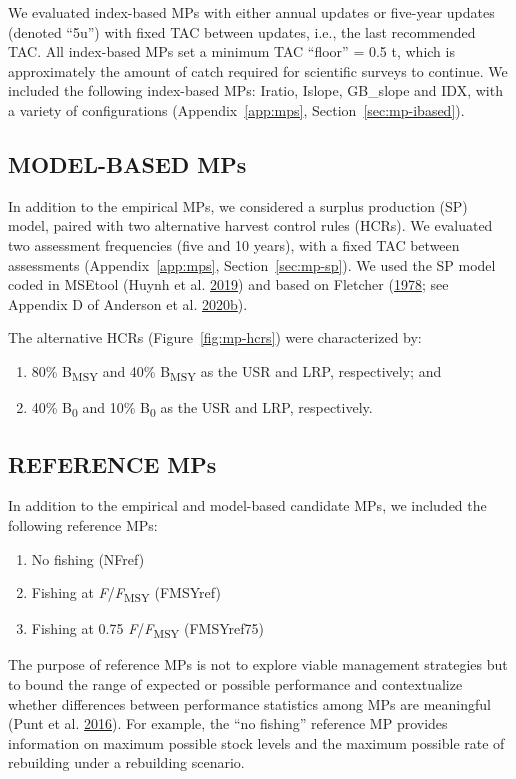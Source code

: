 \documentclass[11pt]{book}
\begin{document}
We evaluated index-based MPs with either annual updates or five-year updates (denoted ``5u'') with fixed TAC between updates, i.e., the last recommended TAC. All index-based MPs set a minimum TAC ``floor'' = 0.5 t, which is approximately the amount of catch required for scientific surveys to continue. We included the following index-based MPs: Iratio, Islope, GB\_slope and IDX, with a variety of configurations (Appendix~\ref{app:mps}, Section~\ref{sec:mp-ibased}).

\hypertarget{model-based-mps}{%
\subsection{MODEL-BASED MPs}\label{model-based-mps}}

In addition to the empirical MPs, we considered a surplus production (SP) model, paired with two alternative harvest control rules (HCRs). We evaluated two assessment frequencies (five and 10 years), with a fixed TAC between assessments (Appendix~\ref{app:mps}, Section~\ref{sec:mp-sp}). We used the SP model coded in MSEtool (Huynh et al. \protect\hyperlink{ref-huynh_msetool_2019}{2019}) and based on Fletcher (\protect\hyperlink{ref-fletcher1978}{1978}; see Appendix D of Anderson et al. \protect\hyperlink{ref-anderson2020gfmp}{2020}\protect\hyperlink{ref-anderson2020gfmp}{b}).

The alternative HCRs (Figure~\ref{fig:mp-hcrs}) were characterized by:
\begin{enumerate}
\def\labelenumi{\arabic{enumi}.}

\item
  80\% B\textsubscript{MSY} and 40\% B\textsubscript{MSY} as the USR and LRP, respectively; and
\item
  40\% B\textsubscript{0} and 10\% B\textsubscript{0} as the USR and LRP, respectively.
\end{enumerate}
\hypertarget{reference-mps}{%
\subsection{REFERENCE MPs}\label{reference-mps}}

In addition to the empirical and model-based candidate MPs, we included the following reference MPs:
\begin{enumerate}
\def\labelenumi{\arabic{enumi}.}

\item
  No fishing (NFref)
\item
  Fishing at \emph{F}/\emph{F}\textsubscript{MSY} (FMSYref)
\item
  Fishing at 0.75 \emph{F}/\emph{F}\textsubscript{MSY} (FMSYref75)
\end{enumerate}
The purpose of reference MPs is not to explore viable management strategies but to bound the range of expected or possible performance and contextualize whether differences between performance statistics among MPs are meaningful (Punt et al. \protect\hyperlink{ref-punt2016}{2016}). For example, the ``no fishing'' reference MP provides information on maximum possible stock levels and the maximum possible rate of rebuilding under a rebuilding scenario.
\end{document}
